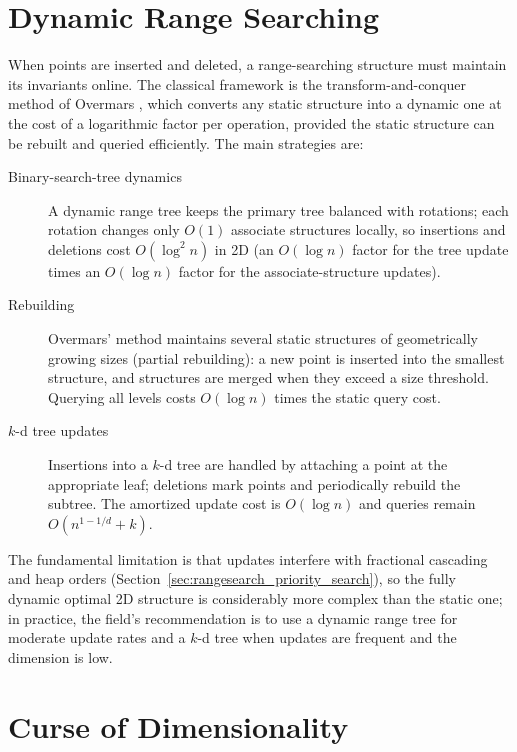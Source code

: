 \section{Dynamic Range Searching}
\label{sec:rangesearch_dynamic}

When points are inserted and deleted, a range-searching structure must
maintain its invariants online. The classical framework is the
transform-and-conquer method of Overmars \cite{overmars1983}, which
converts any static structure into a dynamic one at the cost of a
logarithmic factor per operation, provided the static structure can be
rebuilt and queried efficiently. The main strategies are:

\begin{description}
  \item[Binary-search-tree dynamics] A dynamic range tree keeps the
    primary tree balanced with rotations; each rotation changes only
    $O(1)$ associate structures locally, so insertions and deletions cost
    $O(\log^2 n)$ in 2D (an $O(\log n)$ factor for the tree update times
    an $O(\log n)$ factor for the associate-structure updates).
  \item[Rebuilding] Overmars' method maintains several static structures
    of geometrically growing sizes (partial rebuilding): a new point is
    inserted into the smallest structure, and structures are merged when
    they exceed a size threshold. Querying all levels costs $O(\log n)$
    times the static query cost.
  \item[$k$-d tree updates] Insertions into a $k$-d tree are handled by
    attaching a point at the appropriate leaf; deletions mark points and
    periodically rebuild the subtree. The amortized update cost is
    $O(\log n)$ and queries remain $O(n^{1-1/d} + k)$.
\end{description}

The fundamental limitation is that updates interfere with fractional
cascading and heap orders (Section~\ref{sec:rangesearch_priority_search}),
so the fully dynamic optimal 2D structure is considerably more complex
than the static one; in practice, the field's recommendation is to use a
dynamic range tree for moderate update rates and a $k$-d tree when updates
are frequent and the dimension is low.


\section{Curse of Dimensionality}
\label{sec:rangesearch_curse}

